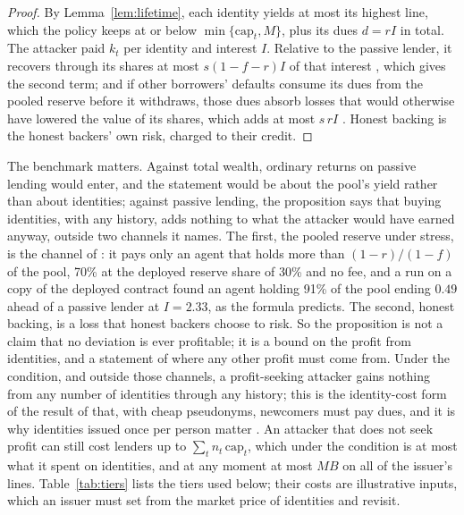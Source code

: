 \documentclass[preprint,11pt,authoryear]{elsarticle}
\begin{document}
\begin{proof}
By Lemma~\ref{lem:lifetime}, each identity yields at most its highest line, which the policy keeps
at or below $\min\{\mathrm{cap}_t,M\}$, plus its dues $d=rI$ in total. The attacker paid $k_t$ per
identity and interest $I$. Relative to the passive lender, it recovers through its shares at most
$s(1-f-r)I$ of that interest \citep[Proposition~7.4]{conservedcredit2026}, which gives the second
term; and if other borrowers' defaults consume its dues from the pooled reserve before it withdraws,
those dues absorb losses that would otherwise have lowered the value of its shares, which adds at
most $s\,rI$ \citep[Proposition~7.5]{conservedcredit2026}. Honest backing is the honest backers' own
risk, charged to their credit.
\end{proof}

The benchmark matters. Against total wealth, ordinary returns on passive lending would enter, and
the statement would be about the pool's yield rather than about identities; against passive lending,
the proposition says that buying identities, with any history, adds nothing to what the attacker
would have earned anyway, outside two channels it names. The first, the pooled reserve under stress,
is the channel of \citet[Proposition~7.5]{conservedcredit2026}: it pays only an agent that holds more
than $(1-r)/(1-f)$ of the pool, 70\% at the deployed reserve share of 30\% and no fee, and a run on a
copy of the deployed contract found an agent holding 91\% of the pool ending $0.49$ ahead of a
passive lender at $I=2.33$, as the formula predicts. The second, honest backing, is a loss that
honest backers choose to risk. So the proposition is not a claim that no deviation is ever
profitable; it is a bound on the profit from identities, and a statement of where any other profit
must come from. Under the condition, and outside those channels, a profit-seeking attacker gains
nothing from any number of identities through any history; this is the identity-cost form of the
result of \citet{friedman2001cheap} that, with cheap pseudonyms, newcomers must pay dues, and it is
why identities issued once per person matter \citep{borge2017personhood}. An attacker that does not
seek profit can still cost lenders up to $\sum_tn_t\,\mathrm{cap}_t$, which under the condition is at
most what it spent on identities, and at any moment at most $MB$ on all of the issuer's lines.
Table~\ref{tab:tiers} lists the tiers used below; their costs are illustrative inputs, which an issuer
must set from the market price of identities and revisit.
\end{document}
